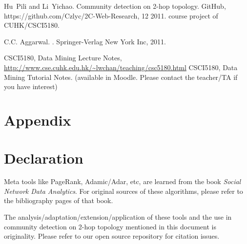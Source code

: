 \documentclass[11pt,a4paper]{article}
\begin{document}

%
%
%


\begin{thebibliography}{99}

Hu~Pili and Li~Yichao.
\newblock Community detection on 2-hop topology.
\newblock GitHub, https://github.com/Czlyc/2C-Web-Research, 12 2011.
\newblock course project of CUHK/CSCI5180.

C.C. Aggarwal.
.
\newblock Springer-Verlag New York Inc, 2011.


	 CSCI5180, Data Mining Lecture Notes, 
		\url{http://www.cse.cuhk.edu.hk/~lwchan/teaching/csc5180.html}
	 CSCI5180, Data Mining Tutorial Notes. 
		(available in Moodle. Please contact the teacher/TA if you have 
		interest)
\end{thebibliography}



\section*{Appendix}


\section*{Declaration}

Meta tools like PageRank, Adamic/Adar, etc, are learned from the book
\textit{Social Network Data Analytics}. For original sources of these 
algorithms, please refer to the bibliography pages of that book.

The analysis/adaptation/extension/application of these tools and 
the use in community detection on 2-hop topology mentioned 
in this document is originality. Please refer to our open source 
repository for citation issues.
\end{document}
